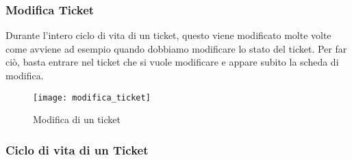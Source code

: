 \subsubsection{Modifica Ticket}
Durante l'intero ciclo di vita di un ticket, questo viene modificato molte volte come avviene ad esempio quando dobbiamo modificare lo stato del ticket. Per far ciò, basta entrare nel ticket che si vuole modificare e appare subito la scheda di modifica.
\begin{figure}[h]
\texttt{[image: modifica\_ticket]}
\caption{Modifica di un ticket} \label{fig:modifica_ticket}
\end{figure}

\subsubsection{Ciclo di vita di un Ticket}
\label{sec:ciclo_vita_ticket}

